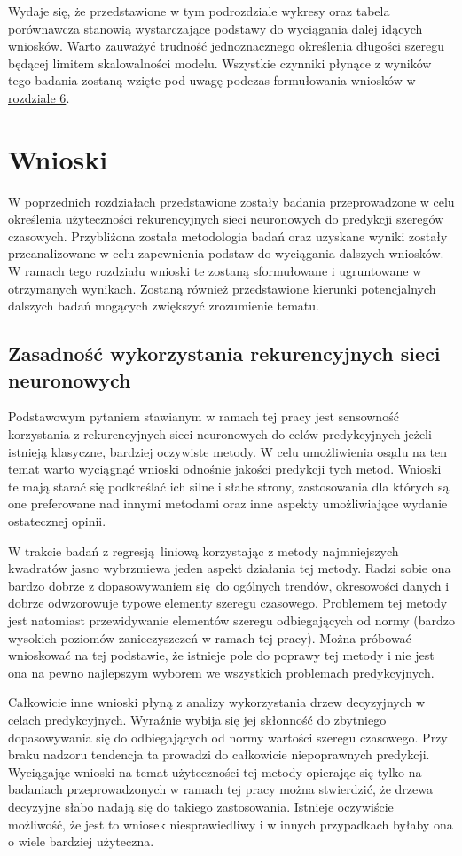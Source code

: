 \documentclass[10pt,a4paper]{article}
\begin{document}
Wydaje się, że przedstawione w tym podrozdziale wykresy oraz tabela porównawcza stanowią wystarczające podstawy do wyciągania dalej idących wniosków. Warto zauważyć trudność jednoznacznego określenia długości szeregu będącej limitem skalowalności modelu. Wszystkie czynniki płynące z wyników tego badania zostaną wzięte pod uwagę podczas formułowania wniosków w \hyperlink{section.6}{rozdziale 6}.

\section{Wnioski}
W poprzednich rozdziałach przedstawione zostały badania przeprowadzone w celu określenia użyteczności rekurencyjnych sieci neuronowych do predykcji szeregów czasowych. Przybliżona została metodologia badań oraz uzyskane wyniki zostały przeanalizowane w celu zapewnienia podstaw do wyciągania dalszych wniosków. W ramach tego rozdziału wnioski te zostaną sformułowane i ugruntowane w otrzymanych wynikach. Zostaną również przedstawione kierunki potencjalnych dalszych badań mogących zwiększyć zrozumienie tematu.

\subsection{Zasadność wykorzystania rekurencyjnych sieci neuronowych}
Podstawowym pytaniem stawianym w ramach tej pracy jest sensowność korzystania z rekurencyjnych sieci neuronowych do celów predykcyjnych jeżeli istnieją klasyczne, bardziej oczywiste metody. W celu umożliwienia osądu na ten temat warto wyciągnąć wnioski odnośnie jakości predykcji tych metod. Wnioski te mają starać się podkreślać ich silne i słabe strony, zastosowania dla których są one preferowane nad innymi metodami oraz inne aspekty umożliwiające wydanie ostatecznej opinii.

W trakcie badań z regresją liniową korzystając z metody najmniejszych kwadratów jasno wybrzmiewa jeden aspekt działania tej metody. Radzi sobie ona bardzo dobrze z dopasowywaniem się do ogólnych trendów, okresowości danych i dobrze odwzorowuje typowe elementy szeregu czasowego. Problemem tej metody jest natomiast przewidywanie elementów szeregu odbiegających od normy (bardzo wysokich poziomów zanieczyszczeń w ramach tej pracy). Można próbować wnioskować na tej podstawie, że istnieje pole do poprawy tej metody i nie jest ona na pewno najlepszym wyborem we wszystkich problemach predykcyjnych. 

Całkowicie inne wnioski płyną z analizy wykorzystania drzew decyzyjnych w celach predykcyjnych. Wyraźnie wybija się jej skłonność do zbytniego dopasowywania się do odbiegających od normy wartości szeregu czasowego. Przy braku nadzoru tendencja ta prowadzi do całkowicie niepoprawnych predykcji. Wyciągając wnioski na temat użyteczności tej metody opierając się tylko na badaniach przeprowadzonych w ramach tej pracy można stwierdzić, że drzewa decyzyjne słabo nadają się do takiego zastosowania. Istnieje oczywiście możliwość, że jest to wniosek niesprawiedliwy i w innych przypadkach byłaby ona o wiele bardziej użyteczna.
\end{document}
